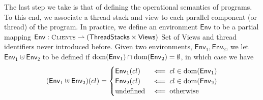 %
%
%
The last step we take is that of defining the operational semantics of 
programs.
To this end, we associate a thread stack and view to each parallel component (or thread) of the program. 
In practice, we define an environment $\mathsf{Env}$ to be 
a partial mapping $\mathsf{Env} : \tidset \rightharpoonup (\thdstackset \times \mathsf{Views})$ 
\ac{Set of Views and thread identifiers never introduced before.} 
Given two environments, $\mathsf{Env}_1, \mathsf{Env}_2$, we let 
$\mathsf{Env_1} \uplus \mathsf{Env}_2$ to be defined if 
$\operatorname{dom}(\mathsf{Env}_1) \cap \operatorname{dom}(\mathsf{Env}_2) = \emptyset$, 
in which case we have 
\[
(\mathsf{Env}_1 \uplus \mathsf{Env}_2)(cl) = \begin{cases}
\mathsf{Env}_1(cl) & \impliedby cl \in \operatorname{dom}(\mathsf{Env}_1)\\
\mathsf{Env}_2(cl) & \impliedby cl \in \operatorname{dom}(\mathsf{Env}_2)\\
\text{undefined} & \impliedby \text{otherwise}
\end{cases}
\]


